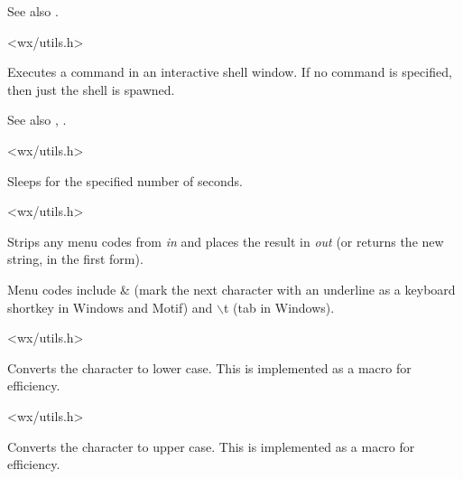 See also .


<wx/utils.h>

\label{wxshell}


Executes a command in an interactive shell window. If no command is
specified, then just the shell is spawned.

See also , .


<wx/utils.h>

\label{wxsleep}


Sleeps for the specified number of seconds.


<wx/utils.h>




Strips any menu codes from {\it in} and places the result
in {\it out} (or returns the new string, in the first form).

Menu codes include \& (mark the next character with an underline
as a keyboard shortkey in Windows and Motif) and $\backslash$t (tab in Windows).


<wx/utils.h>

\label{wxtolower}


Converts the character to lower case. This is implemented as a macro for efficiency.


<wx/utils.h>

\label{wxtoupper}


Converts the character to upper case. This is implemented as a macro for efficiency.

